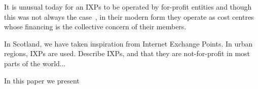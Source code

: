It is unusual today for an \acp{IXP} to be operated by for-profit
entities and though this was not always the
case~\cite{Ager:2012:ALE:2342356.2342393,Chatzis:2013:MIM:2541468.2541473,hayes1997computing}, 
in their modern form they operate as cost centres whose financing is
the collective concern of their members.

In Scotland, we have taken inspiration from Internet Exchange
Points. In urban regions, IXPs are used. Describe IXPs, and that they
are not-for-profit in most parts of the world...

In this paper we present 
